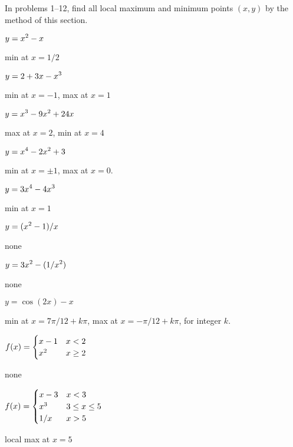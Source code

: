 \begin{exercises} In problems 1--12, find all local maximum and minimum
points $(x,y)$ by the method of this section.

\twocol
\exercise $\displaystyle y=x^2-x$ 
\begin{answer} min at $x=1/2$
\end{answer}

\exercise $\displaystyle y=2+3x-x^3$ 
\begin{answer} min at $x=-1$, max at $x=1$
\end{answer}

\exercise $\displaystyle y=x^3-9x^2+24x$
\begin{answer} max at $x=2$, min at $x=4$
\end{answer}

\exercise $\displaystyle y=x^4-2x^2+3$ 
\begin{answer} min at $x=\pm 1$, max at $x=0$.
\end{answer}

\exercise $\displaystyle y=3x^4-4x^3$
\begin{answer} min at $x=1$
\end{answer}

\exercise $\displaystyle y=(x^2-1)/x$
\begin{answer} none
\end{answer}

\exercise $\displaystyle y=3x^2-(1/x^2)$ 
\begin{answer} none
\end{answer}

\exercise $y=\cos(2x)-x$ 
\begin{answer} min at $x=7\pi/12+k\pi$, max at $x=-\pi/12+k\pi$, for integer $k$.
\end{answer}

\exercise $\displaystyle f(x) = \begin{cases} x-1 & x < 2  \\
x^2 & x\geq 2 \end{cases}$
\begin{answer} none
\end{answer}

 \exercise $\displaystyle f(x) = \begin{cases} x-3 & x < 3  \\
x^3  & 3\leq x \leq 5 \\
1/x  & x>5 \end{cases}$
\begin{answer} local max at $x=5$
\end{answer}


\end{exercises}
